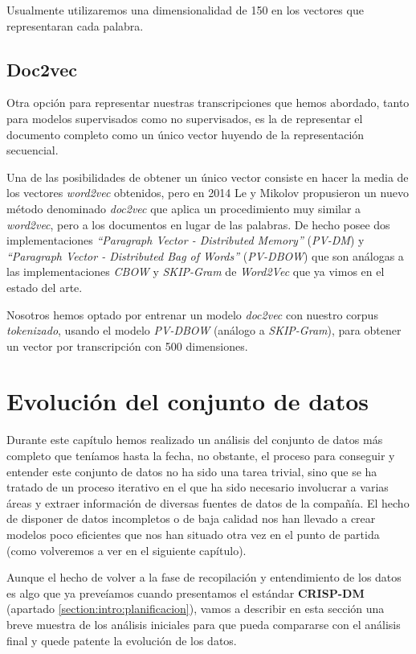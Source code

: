 Usualmente utilizaremos una dimensionalidad de 150 en los vectores que representaran cada palabra.

\subsection{Doc2vec}

Otra opción para representar nuestras transcripciones que hemos abordado, tanto para modelos supervisados como no supervisados, es la de representar el documento completo como un único vector huyendo de la representación secuencial.

Una de las posibilidades de obtener un único vector consiste en hacer la media de los vectores \textit{word2vec} obtenidos, pero en 2014 Le y Mikolov \cite{doc2vec} propusieron un nuevo método denominado \textit{doc2vec} que aplica un procedimiento muy similar a \textit{word2vec}, pero a los documentos en lugar de las palabras. De hecho posee dos implementaciones \textit{``Paragraph Vector - Distributed Memory''} (\textit{PV-DM}) y \textit{``Paragraph Vector - Distributed Bag of Words''} (\textit{PV-DBOW}) que son análogas a las implementaciones \textit{CBOW} y \textit{SKIP-Gram} de \textit{Word2Vec} que ya vimos en el estado del arte.


Nosotros hemos optado por entrenar un modelo \textit{doc2vec} con nuestro corpus \textit{tokenizado},  usando el modelo \textit{PV-DBOW} (análogo a \textit{SKIP-Gram}), para obtener un vector por transcripción con 500 dimensiones.


\section{Evolución del conjunto de datos}
\label{section:data:evol}

Durante este capítulo hemos realizado un análisis del conjunto de datos más completo que teníamos hasta la fecha, no obstante, el proceso para conseguir y entender este conjunto de datos no ha sido una tarea trivial, sino que se ha tratado de un proceso iterativo en el que ha sido necesario involucrar a varias áreas y extraer información de diversas fuentes de datos de la compañía. El hecho de disponer de datos incompletos o de baja calidad nos han llevado a crear modelos poco eficientes que nos han situado otra vez en el punto de partida (como volveremos a ver en el siguiente capítulo). 

Aunque el hecho de volver a la fase de recopilación y entendimiento de los datos es algo que ya preveíamos cuando presentamos el estándar \textbf{CRISP-DM} (apartado \ref{section:intro:planificacion}),  vamos a describir en esta sección una breve muestra de los análisis iniciales para que pueda compararse con el análisis final y quede patente la evolución de los datos.


